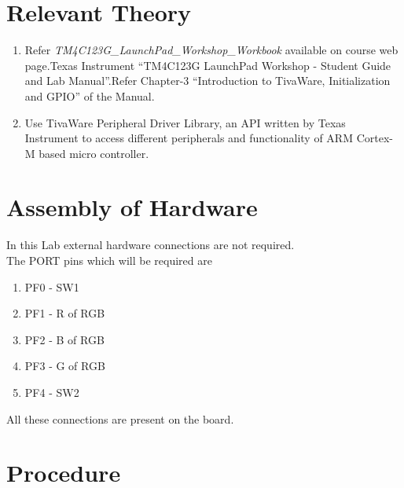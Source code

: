 \documentclass[a4paper,12pt,oneside]{book}
\begin{document}
\section {Relevant Theory}
\begin{enumerate}
\item Refer \textit {TM4C123G\_LaunchPad\_Workshop\_Workbook} available on course web page.Texas Instrument “TM4C123G
LaunchPad Workshop - Student Guide and Lab Manual”.Refer Chapter-3
“Introduction to TivaWare, Initialization and GPIO” of the Manual.
\item Use TivaWare Peripheral Driver Library, an API written by Texas Instrument to
access different peripherals and functionality of ARM Cortex-M based micro controller. 
\end{enumerate}
\newpage
\section{Assembly of Hardware}
In this Lab external hardware connections are not required.\\
The PORT pins which will be required are 
\begin{enumerate}
\item PF0 - SW1
\item PF1 - R of RGB
\item PF2 - B of RGB
\item PF3 - G of RGB
\item PF4 - SW2
\end{enumerate}
All these connections are present on the board.
\section {Procedure}

\end{document}
